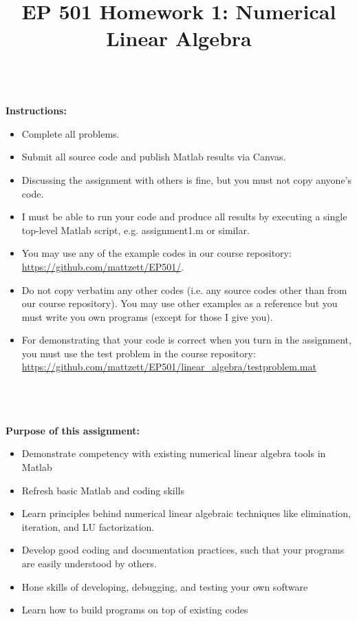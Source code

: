 \documentclass{article}
\begin{document}
\title{EP 501 Homework 1:  Numerical Linear Algebra}

\maketitle

~\\
\textbf{Instructions:}  
\begin{itemize}
  \item Complete all problems.
  \item Submit all source code and publish Matlab results via Canvas.  
  \item Discussing the assignment with others is fine, but you must not copy anyone's code.  
  \item I must be able to run your code and produce all results by executing a single top-level Matlab script, e.g. \textsf{assignment1.m} or similar.  
  \item You may use any of the example codes in our course repository:  \url{https://github.com/mattzett/EP501/}.
  \item Do not copy verbatim any other codes (i.e. any source codes other than from our course repository).  You may use other examples as a reference but you must write you own programs (except for those I give you).  
  \item For demonstrating that your code is correct when you turn in the assignment, you must use the test problem in the course repository:  \url{https://github.com/mattzett/EP501/linear_algebra/testproblem.mat}
\end{itemize}
~\\~\\~\\
\textbf{Purpose of this assignment:}  
\begin{itemize}
  \item Demonstrate competency with existing numerical linear algebra tools in Matlab
  \item Refresh basic Matlab and coding skills
  \item Learn principles behind numerical linear algebraic techniques like elimination, iteration, and LU factorization.  
  \item Develop good coding and documentation practices, such that your programs are easily understood by others.  
  \item Hone skills of developing, debugging, and testing your own software
  \item Learn how to build programs on top of existing codes
\end{itemize}
\end{document}
